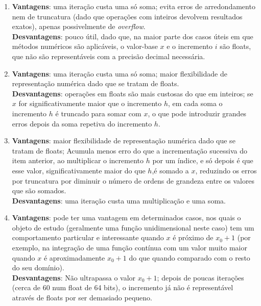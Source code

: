 \setcounter{chapter}{15}
{
\renewcommand{\thesubsection}{\thesection\alph{subsection}}

\begin{enumerate}
    \item
    \textbf{Vantagens}: uma iteração custa uma só soma; evita erros de arredondamento nem de truncatura (dado que operações com inteiros devolvem resultados exatos), apenas possivelmente de \textit{overflow}.\\
    \textbf{Desvantagens}: pouco útil, dado que, na maior parte dos casos úteis em que métodos numéricos são aplicáveis, o valor-base $x$ e o incremento $i$ são floats, que não são representáveis com a precisão decimal necessária.
    \item 
    \textbf{Vantagens}: uma iteração custa uma só soma; maior flexibilidade de representação numérica dado que se tratam de floats.\\
    \textbf{Desvantagens}: operações em floats são mais custosas do que em inteiros; se $x$ for significativamente maior que o incremento $h$, em cada soma o incremento $h$ é truncado para somar com $x$, o que pode introduzir grandes erros depois da soma repetiva do incremento $h$.
    \item
    \textbf{Vantagens}: maior flexibilidade de representação numérica dado que se tratam de floats; Acumula menos erro do que a incrementação sucessiva do item anterior, ao multiplicar o incremento $h$ por um índice, e só depois é que esse valor, significativamente maior do que $h$,é somado a $x$, reduzindo os erros por truncatura por diminuir o número de ordens de grandeza entre os valores que são somados.\\
    \textbf{Desvantagens}: uma iteração custa uma multiplicação e uma soma.
    \item
    \textbf{Vantagens}: pode ter uma vantagem em determinados casos, nos quais o objeto de estudo (geralmente uma função unidimensional neste caso) tem um comportamento particular e interessante quando $x$ é próximo de $x_0+1$ (por exemplo, na integração de uma função contínua com um valor muito maior quando $x$ é aproximadamente $x_0+1$ do que quando comparado com o resto do seu domínio).\\
    \textbf{Desvantagens}: Não ultrapassa o valor $x_0+1$; depois de poucas iterações (cerca de 60 num float de 64 bits), o incremento já não é representável através de floats por ser demasiado pequeno.
\end{enumerate}

}

